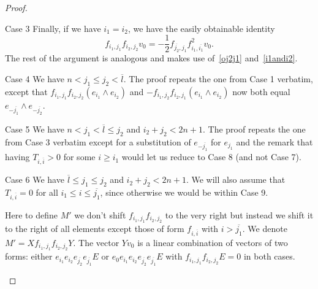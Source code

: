 \documentclass[ALCO,ThmDefs,Unicode]{cedram}
\begin{document}
\begin{proof}
\begin{enonce*}[remark]{Case 3}
Finally, if we have $i_1=i_2$, we have the easily obtainable identity
\[
f_{i_1,j_1}f_{i_2,j_2}v_0=-\frac12f_{\overline{j_2},j_1}f_{i_1,\overline{i_1}}^2v_0.
\]
The rest of the argument is analogous and makes use of~\eqref{oj2j1} and~\eqref{i1andi2}.
\end{enonce*}


\begin{enonce*}[remark]{Case 4} We have $n<j_1\le j_2<\overline l$. The proof repeats the one from Case 1 verbatim, except that $f_{i_1,j_1}f_{i_2,j_2}(e_{i_1}\wedge e_{i_2})$ and $-f_{i_1,j_2}f_{i_2,j_1}(e_{i_1}\wedge e_{i_2})$ now both equal $e_{-\overline{j_1}}\wedge e_{-\overline{j_2}}$.
\end{enonce*}

\begin{enonce*}[remark]{Case 5} We have $n<j_1<\overline l\le j_2$ and $i_2+j_2<2n+1$. The proof repeats the one from Case 3 verbatim except for a substitution of $e_{-\overline{j_1}}$ for $e_{j_1}$ and the remark that having $T_{i,\overline i}>0$ for some $i\ge i_1$ would let us reduce to Case 8 (and not Case 7).
\end{enonce*}

\begin{enonce*}[remark]{Case 6} We have $\overline l\le j_1\le j_2$ and $i_2+j_2<2n+1$. We will also assume that $T_{i,\overline i}=0$ for all $i_1\le i\le \overline{j_1}$, since otherwise we would be within Case 9.

Here to define $M'$ we don't shift $f_{i_1,j_1}f_{i_2,j_2}$ to the very right but instead we shift it to the right of all elements except those of form $f_{i,\overline i}$ with $i>\overline{j_1}$. We denote $M'=Xf_{i_1,j_1}f_{i_2,j_2}Y$. The vector $Yv_0$ is a linear combination of vectors of two forms: either $e_{i_1}e_{i_2}e_{\overline{j_2}}e_{\overline{j_1}}E$ or $e_0e_{i_1}e_{i_2}e_{\overline{j_2}}e_{\overline{j_1}}E$ with $f_{i_1,j_1}f_{i_2,j_2}E=0$ in both cases.


\end{enonce*}
\end{proof}
\end{document}
